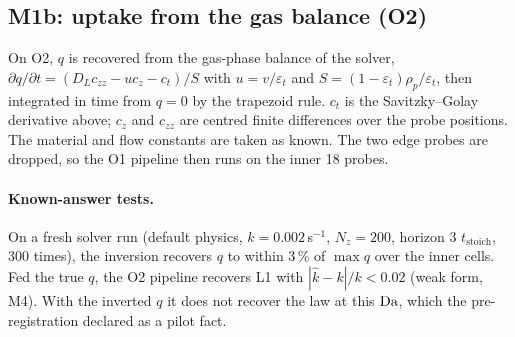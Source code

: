 \subsection*{M1b: uptake from the gas balance (O2)}
On O2, $q$ is recovered from the gas-phase balance of the solver,
$\partial q/\partial t = (D_L c_{zz} - u c_z - c_t)/S$ with $u = v/\varepsilon_t$ and
$S = (1-\varepsilon_t)\rho_p/\varepsilon_t$, then integrated in time from $q = 0$ by the
trapezoid rule. $c_t$ is the Savitzky--Golay derivative above; $c_z$ and $c_{zz}$ are centred
finite differences over the probe positions. The material and flow constants are taken as
known. The two edge probes are dropped, so the O1 pipeline then runs on the inner 18 probes.

\paragraph{Known-answer tests.} On a fresh solver run (default physics, $k = 0.002$\,s$^{-1}$,
$N_z = 200$, horizon 3 $t_{\mathrm{stoich}}$, 300 times), the inversion recovers $q$ to within
3\,\% of $\max q$ over the inner cells. Fed the true $q$, the O2 pipeline recovers L1 with
$|\hat k - k|/k < 0.02$ (weak form, M4). With the inverted $q$ it does not recover the law at
this $\mathrm{Da}$, which the pre-registration declared as a pilot fact.

